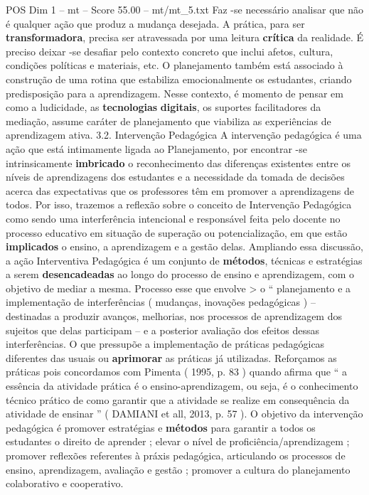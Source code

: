 \begin{textsample}{POS Dim 1 – mt – Score 55.00 – mt/mt\_5.txt}
Faz -se necessário analisar que não é qualquer ação que produz a mudança desejada.
A prática, para ser \textbf{transformadora}, precisa ser atravessada por uma leitura \textbf{crítica} da realidade.
É preciso deixar -se desafiar pelo contexto concreto que inclui afetos, cultura, condições políticas e materiais, etc.
O planejamento também está associado à construção de uma rotina que estabiliza emocionalmente os estudantes, criando predisposição para a aprendizagem.
Nesse contexto, é momento de pensar em como a ludicidade, as \textbf{tecnologias} \textbf{digitais}, os suportes facilitadores da mediação, assume caráter de planejamento que viabiliza as experiências de aprendizagem ativa. 3.2.
Intervenção Pedagógica A intervenção pedagógica é uma ação que está intimamente ligada ao Planejamento, por encontrar -se intrinsicamente \textbf{imbricado} o reconhecimento das diferenças existentes entre os níveis de aprendizagens dos estudantes e a necessidade da tomada de decisões acerca das expectativas que os professores têm em promover a aprendizagens de todos.
Por isso, trazemos a reflexão sobre o conceito de Intervenção Pedagógica como sendo uma interferência intencional e responsável feita pelo docente no processo educativo em situação de superação ou potencialização, em que estão \textbf{implicados} o ensino, a aprendizagem e a gestão delas.
Ampliando essa discussão, a ação Interventiva Pedagógica é um conjunto de \textbf{métodos}, técnicas e estratégias a serem \textbf{desencadeadas} ao longo do processo de ensino e aprendizagem, com o objetivo de mediar a mesma.
Processo esse que envolve > o “ planejamento e a implementação de interferências ( mudanças, inovações pedagógicas ) – destinadas a produzir avanços, melhorias, nos processos de aprendizagem dos sujeitos que delas participam – e a posterior avaliação dos efeitos dessas interferências.
O que pressupõe a implementação de práticas pedagógicas diferentes das usuais ou \textbf{aprimorar} as práticas já utilizadas.
Reforçamos as práticas pois concordamos com Pimenta ( 1995, p. 83 ) quando afirma que “ a essência da atividade prática é o ensino-aprendizagem, ou seja, é o conhecimento técnico prático de como garantir que a atividade se realize em consequência da atividade de ensinar ” ( DAMIANI et all, 2013, p. 57 ).
O objetivo da intervenção pedagógica é promover estratégias e \textbf{métodos} para garantir a todos os estudantes o direito de aprender ; elevar o nível de proficiência/aprendizagem ; promover reflexões referentes à práxis pedagógica, articulando os processos de ensino, aprendizagem, avaliação e gestão ; promover a cultura do planejamento colaborativo e cooperativo.

\end{textsample}
